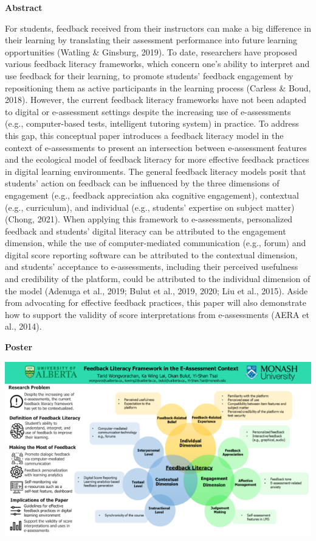 \documentclass[
]{book}
\begin{document}
\textbf{Abstract}

For students, feedback received from their instructors can make a big difference in their learning by translating their assessment performance into future learning opportunities (Watling \& Ginsburg, 2019). To date, researchers have proposed various feedback literacy frameworks, which concern one's ability to interpret and use feedback for their learning, to promote students' feedback engagement by repositioning them as active participants in the learning process (Carless \& Boud, 2018). However, the current feedback literacy frameworks have not been adapted to digital or e-assessment settings despite the increasing use of e-assessments (e.g., computer-based tests, intelligent tutoring system) in practice. To address this gap, this conceptual paper introduces a feedback literacy model in the context of e-assessments to present an intersection between e-assessment features and the ecological model of feedback literacy for more effective feedback practices in digital learning environments. The general feedback literacy models posit that students' action on feedback can be influenced by the three dimensions of engagement (e.g., feedback appreciation aka cognitive engagement), contextual (e.g., curriculum), and individual (e.g., students' expertise on subject matter) (Chong, 2021). When applying this framework to e-assessments, personalized feedback and students' digital literacy can be attributed to the engagement dimension, while the use of computer-mediated communication (e.g., forum) and digital score reporting software can be attributed to the contextual dimension, and students' acceptance to e-assessments, including their perceived usefulness and credibility of the platform, could be attributed to the individual dimension of the model (Adenuga et al., 2019; Bulut et al., 2019, 2020; Liu et al., 2015). Aside from advocating for effective feedback practices, this paper will also demonstrate how to support the validity of score interpretations from e-assessments (AERA et al., 2014).

\textbf{Poster}

\includegraphics{Content/TW.png}
\end{document}
